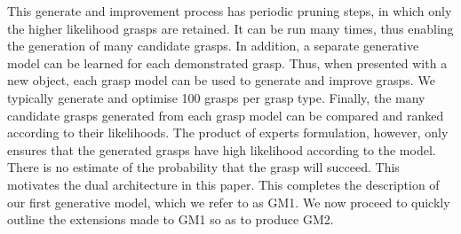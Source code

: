 This generate and improvement process has periodic pruning steps, in which only the higher likelihood grasps are retained. It can be run many times, thus enabling the generation of many candidate grasps. In addition, a separate generative model can be learned for each demonstrated grasp. Thus, when presented with a new object, each grasp model can be used to generate and improve grasps. We typically generate and optimise 100 grasps per grasp type. Finally, the many candidate grasps generated from each grasp model can be compared and ranked according to their likelihoods. The product of experts formulation, however, only ensures that the generated grasps have high likelihood according to the model. There is no estimate of the probability that the grasp will succeed. This motivates the dual architecture in this paper. This completes the description of our first generative model, which we refer to as GM1. We now proceed to quickly outline the extensions made to GM1 so as to produce GM2.